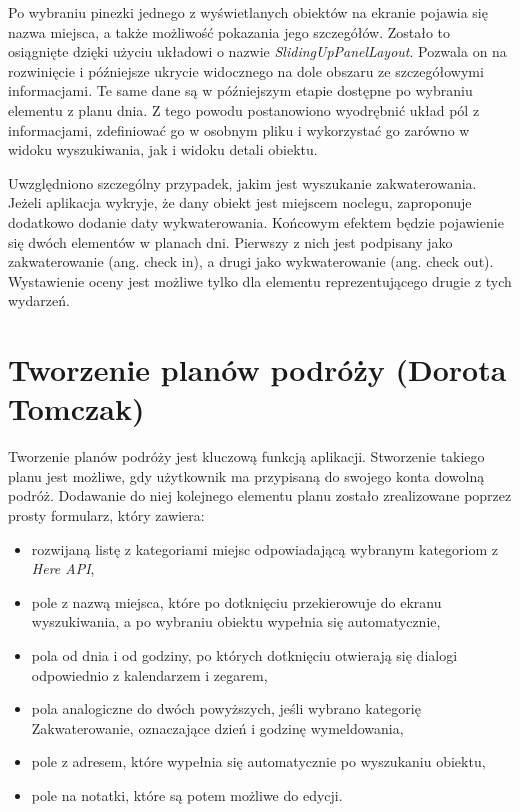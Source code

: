 \documentclass[10pt,twoside,a4paper]{report}
\begin{document}
\par Po wybraniu pinezki jednego z wyświetlanych obiektów na ekranie pojawia się nazwa miejsca, a także możliwość pokazania jego szczegółów. Zostało to osiągnięte dzięki użyciu układowi o nazwie \textit{SlidingUpPanelLayout}\cite{SlidingUpPanelLayout}. Pozwala on na rozwinięcie i późniejsze ukrycie widocznego na dole obszaru ze szczegółowymi informacjami. Te same dane są w późniejszym etapie dostępne po wybraniu elementu z planu dnia. Z tego powodu postanowiono wyodrębnić układ pól z informacjami, zdefiniować go w osobnym pliku i wykorzystać go zarówno w widoku wyszukiwania, jak i widoku detali obiektu.

\par Uwzględniono szczególny przypadek, jakim jest wyszukanie zakwaterowania. Jeżeli aplikacja wykryje, że dany obiekt jest miejscem noclegu, zaproponuje dodatkowo dodanie daty wykwaterowania. Końcowym efektem będzie pojawienie się dwóch elementów w planach dni. Pierwszy z nich jest podpisany jako zakwaterowanie (ang. check in), a drugi jako wykwaterowanie (ang. check out). Wystawienie oceny jest możliwe tylko dla elementu reprezentującego drugie z tych wydarzeń.


\section{Tworzenie planów podróży (Dorota Tomczak)}
\par Tworzenie planów podróży jest kluczową funkcją aplikacji. Stworzenie takiego planu jest możliwe, gdy użytkownik ma przypisaną do swojego konta dowolną podróż. Dodawanie do niej kolejnego elementu planu zostało zrealizowane poprzez prosty formularz, który zawiera:
\begin{itemize}
\item rozwijaną listę z kategoriami miejsc odpowiadającą wybranym kategoriom z \textit{Here API}\cite{Here},
\item pole z nazwą miejsca, które po dotknięciu przekierowuje do ekranu wyszukiwania, a po wybraniu obiektu wypełnia się automatycznie,
\item pola od dnia i od godziny, po których dotknięciu otwierają się dialogi odpowiednio z kalendarzem i zegarem,
\item pola analogiczne do dwóch powyższych, jeśli wybrano kategorię Zakwaterowanie, oznaczające dzień i godzinę wymeldowania,
\item pole z adresem, które wypełnia się automatycznie po wyszukaniu obiektu,
\item pole na notatki, które są potem możliwe do edycji.
\end{itemize}
\end{document}
